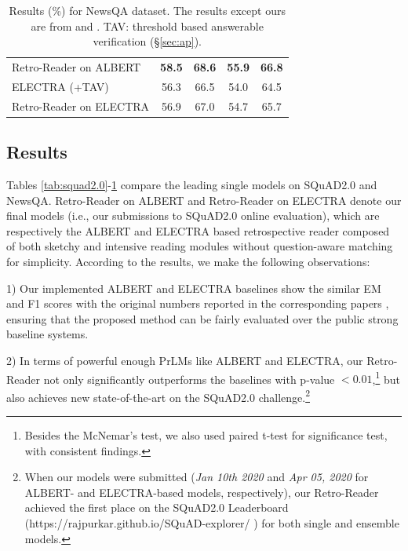 \documentclass[letterpaper]{article} %
\begin{document}
\begin{table}
{\begin{tabular}{l c c c c }
			Retro-Reader on ALBERT  &  \textbf{58.5} & \textbf{68.6} & \textbf{55.9} &  \textbf{66.8} \\
			ELECTRA (+TAV)  & 56.3 & 66.5 & 54.0 & 64.5\\
			Retro-Reader on ELECTRA & 56.9 &  67.0 & 54.7& 65.7 \\
			\bottomrule
		\end{tabular}
	}
	\caption{Results (\%) for NewsQA dataset. The results except ours are from \citeauthor{tay2018densely}  and \citeauthor{back2020neurquri} . TAV: threshold based answerable verification (\S\ref{sec:ap}).}\label{tab:newsqa}
\end{table}



\subsection{Results}
Tables \ref{tab:squad2.0}-\ref{tab:newsqa} compare the leading single models on SQuAD2.0 and NewsQA.
Retro-Reader on ALBERT and Retro-Reader on ELECTRA denote our final models (i.e., our submissions to SQuAD2.0 online evaluation), which are respectively the ALBERT and ELECTRA based retrospective reader composed of both sketchy and intensive reading modules without question-aware matching for simplicity. %
According to the results, we make the following observations:

1) Our implemented ALBERT and ELECTRA baselines show the similar EM and F1 scores with the original numbers reported in the corresponding papers \cite{Lan2020ALBERT,clark2019electra}, ensuring that the proposed method can be fairly evaluated over the public strong baseline systems.

2) In terms of powerful enough PrLMs like ALBERT and ELECTRA, our Retro-Reader not only significantly outperforms the baselines with p-value $<0.01$,\footnote{Besides the McNemar's test, we also used paired t-test for significance test, with consistent findings.} but also achieves new state-of-the-art on the SQuAD2.0 challenge.\footnote{When our models were submitted (\textit{Jan 10th 2020} and \textit{Apr 05, 2020} for ALBERT- and ELECTRA-based models, respectively), our Retro-Reader achieved the first place on the SQuAD2.0 Leaderboard (https://rajpurkar.github.io/SQuAD-explorer/ ) for both single and ensemble models.}
\end{document}
